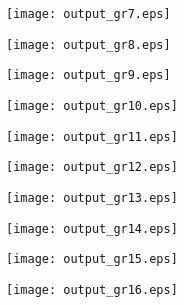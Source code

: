 \documentclass{article}
\begin{document}
\texttt{[image: output\_gr7.eps]}

\texttt{[image: output\_gr8.eps]}

\texttt{[image: output\_gr9.eps]}

\texttt{[image: output\_gr10.eps]}

\texttt{[image: output\_gr11.eps]}

\texttt{[image: output\_gr12.eps]}

\texttt{[image: output\_gr13.eps]}

\texttt{[image: output\_gr14.eps]}

\texttt{[image: output\_gr15.eps]}

\texttt{[image: output\_gr16.eps]}

\begin{doublespace}
\noindent\(\pmb{\text{}}\)
\end{doublespace}

\begin{doublespace}
\noindent\(\pmb{\text{}}\)
\end{doublespace}
\end{document}
